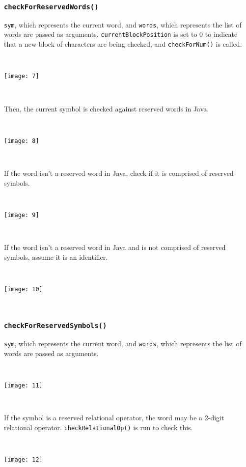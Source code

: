 \documentclass[11pt]{article}
\begin{document}
\subsubsection{{\tt checkForReservedWords()}}

{\tt sym}, which represents the current word, and {\tt words}, which represents the list of words are passed as arguments. {\tt currentBlockPosition} is set to 0 to indicate that a new block of characters are being checked, and {\tt checkForNum()} is called.

~
\begin{center}
\texttt{[image: 7]}
\end{center}
~

Then, the current symbol is checked against reserved words in Java.

~
\begin{center}
\texttt{[image: 8]}
\end{center}
~

If the word isn’t a reserved word in Java, check if it is comprised of reserved symbols.

~
\begin{center}
\texttt{[image: 9]}
\end{center}
~

If the word isn’t a reserved word in Java and is not comprised of reserved symbols, assume it is an identifier.

~
\begin{center}
\texttt{[image: 10]}
\end{center}
~

\subsubsection{{\tt checkForReservedSymbols()}}

{\tt sym}, which represents the current word, and {\tt words}, which represents the list of words are passed as arguments.

~
\begin{center}
\texttt{[image: 11]}
\end{center}
~

If the symbol is a reserved relational operator, the word may be a 2-digit relational operator. {\tt checkRelationalOp()} is run to check this.

~
\begin{center}
\texttt{[image: 12]}
\end{center}
~
\end{document}
